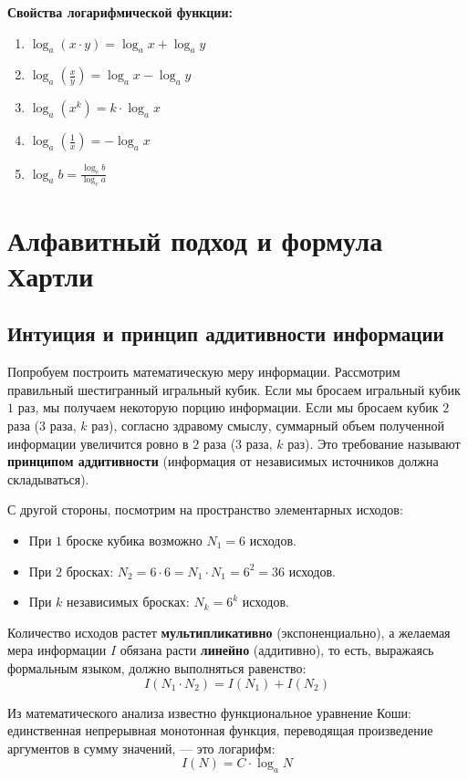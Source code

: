 \documentclass[11pt,a4paper]{article}
\begin{document}
\textbf{Свойства логарифмической функции:}
\begin{enumerate}
    \item $\log_a (x \cdot y) = \log_a x + \log_a y$
    \item $\log_a \left(\frac{x}{y}\right) = \log_a x - \log_a y$
    \item $\log_a (x^k) = k \cdot \log_a x$
    \item $\log_a \left(\frac{1}{x}\right) = -\log_a x$
    \item $\log_a b = \frac{\log_c b}{\log_c a}$
\end{enumerate}

\section{Алфавитный подход и формула Хартли}

\subsection{Интуиция и принцип аддитивности информации}
Попробуем построить математическую меру информации. Рассмотрим правильный шестигранный игральный кубик.
Если мы бросаем игральный кубик $1$ раз, мы получаем некоторую порцию информации. Если мы бросаем кубик $2$ раза ($3$ раза, $k$ раз), согласно здравому смыслу, суммарный объем полученной информации увеличится ровно в $2$ раза ($3$ раза, $k$ раз).
Это требование называют \textbf{принципом аддитивности} (информация от независимых источников должна складываться).

С другой стороны, посмотрим на пространство элементарных исходов:
\begin{itemize}
    \item При $1$ броске кубика возможно $N_1 = 6$ исходов.
    \item При $2$ бросках: $N_2 = 6 \cdot 6 = N_1 \cdot N_1 = 6^2 = 36$ исходов.
    \item При $k$ независимых бросках: $N_k = 6^k$ исходов.
\end{itemize}
Количество исходов растет \textbf{мультипликативно} (экспоненциально), а желаемая мера информации $I$ обязана расти \textbf{линейно} (аддитивно), то есть, выражаясь формальным языком, должно выполняться равенство:
$$I(N_1 \cdot N_2) = I(N_1) + I(N_2)$$

Из математического анализа известно функциональное уравнение Коши: единственная непрерывная монотонная функция, переводящая произведение аргументов в сумму значений, --- это логарифм:
$$I(N) = C \cdot \log_a N$$
\end{document}

